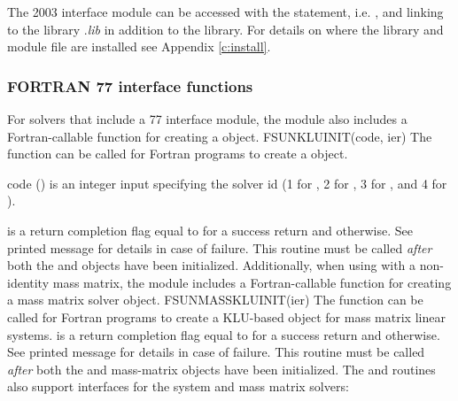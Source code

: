 The {\F} 2003 {\sunlinsolklu} interface module can be accessed with the 
statement, i.e. , and linking to the library
.{\em lib} in addition to the {\CC} library.
For details on where the library and module file
 are installed see Appendix \ref{c:install}.

\subsubsection*{FORTRAN 77 interface functions}
For solvers that include a {\F} 77 interface module, the {\sunlinsolklu}
module also includes a Fortran-callable function for creating a
 object.
%
%
{
  FSUNKLUINIT(code, ier)
}
{
  The function  can be called for Fortran programs
  to create a {\sunlinsolklu} object.
}
{
  \begin{args}[code]
  \item[code] ()
    is an integer input specifying the solver id (1 for {\cvode}, 2
    for {\ida}, 3 for {\kinsol}, and 4 for {\arkode}).
  \end{args}
}
{
   is a return completion flag equal to  for a success
  return and  otherwise. See printed message for details in case
  of failure.
}
{
  This routine must be
  called \emph{after} both the {\nvector} and {\sunmatrix} objects have
  been initialized.
}
Additionally, when using {\arkode} with a non-identity
mass matrix, the {\sunlinsolklu} module includes a Fortran-callable
function for creating a  mass matrix solver
object.
%
%
{
  FSUNMASSKLUINIT(ier)
}
{
  The function  can be called for Fortran programs
  to create a KLU-based  object for mass matrix linear
  systems.
}
{}
{
   is a  return completion flag equal to  for a success
  return and  otherwise. See printed message for details in case
  of failure.
}
{
  This routine must be
  called \emph{after} both the {\nvector} and {\sunmatrix} mass-matrix
  objects have been initialized.
}
The  and 
routines also support {\F} interfaces for the system and mass
matrix solvers:
%
